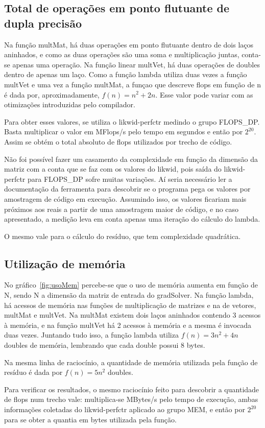 \documentclass[12pt]{article}
\begin{document}
\subsection{Total de operações em ponto flutuante de dupla precisão}\label{sec:flopOp}

Na função multMat, há duas operações em ponto flutuante dentro de dois laços
aninhados, e como as duas operações são uma soma e multiplicação juntas,
conta-se apenas uma operação. Na função linear multVet, há duas operações de
doubles dentro de apenas um laço. Como a função lambda utiliza duas vezes a
função multVet e uma vez a função multMat, a funçao que descreve flops em função
de n é dada por, aproximadamente, $f(n) = n^2 + 2n$. Esse valor pode variar com
as otimizações introduzidas pelo compilador.

Para obter esses valores, se utiliza o likwid-perfctr medindo o grupo FLOPS\_DP.
Basta multiplicar o valor em MFlops/s pelo tempo em segundos e então por
$2^{20}$. Assim se obtém o total absoluto de flops utilizados por trecho de
código.

Não foi possível fazer um casamento da complexidade em função da dimensão da
matriz com a conta que se faz com os valores do likwid, pois saída do
likwid-perfctr para FLOPS\_DP sofre muitas variações. Aí seria necessário ler a
documentação da ferramenta  para descobrir se o programa pega os valores por
amostragem de código em execução. Assumindo isso, os valores ficariam mais
próximos aos reais a partir de uma amostragem maior de código, e no caso
apresentado, a medição leva em conta apenas uma iteração do cálculo do lambda.

O mesmo vale para o cálculo do resíduo, que tem complexidade quadrática.

\subsection{Utilização de memória}\label{sec:utilizacaoMemoria}

No gráfico~\ref{fig:usoMem} percebe-se que o uso de memória aumenta em função de
N, sendo N a dimensão da matriz de entrada do gradSolver. Na função lambda, há
acessos de memória nas funções de multiplicação de matrizes e na de vetores,
multMat e multVet. Na multMat existem dois laços aninhados contendo 3 acessos à
memória, e na função multVet há 2 acessos à memória e a mesma é invocada duas
vezes. Juntando tudo isso, a função lambda utiliza $f(n) = 3n^2 + 4n$ doubles de
memória, lembrando que cada double possui 8 bytes.

Na mesma linha de raciocínio, a quantidade de memória utilizada pela função de
resíduo é dada por $f(n) = 5n^2$ doubles.

Para verificar os resultados, o mesmo raciocínio feito para descobrir a
quantidade de flops num trecho vale: multiplica-se MBytes/s pelo tempo de
execução, ambas informações coletadas do likwid-perfctr aplicado ao grupo MEM, e
então por $2^{20}$ para se obter a quantia em bytes utilizada pela função.
\end{document}
